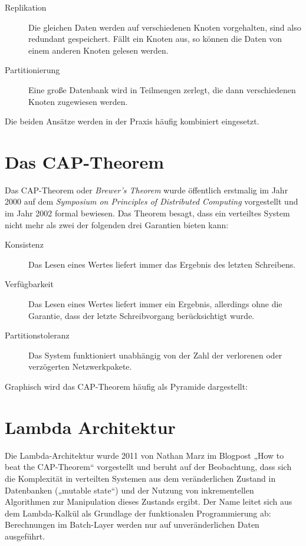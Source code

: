 \documentclass[a4paper,11pt]{scrartcl}
\begin{document}
  \begin{description}
    \item[Replikation] Die gleichen Daten werden auf verschiedenen Knoten
      vorgehalten, sind also redundant gespeichert. Fällt ein Knoten aus, so
      können die Daten von einem anderen Knoten gelesen werden.
    \item[Partitionierung] Eine große Datenbank wird in Teilmengen zerlegt, die
      dann verschiedenen Knoten zugewiesen werden.
  \end{description}

  Die beiden Ansätze werden in der Praxis häufig kombiniert eingesetzt.

  \section{Das CAP-Theorem}
  Das CAP-Theorem oder \textit{Brewer's Theorem} wurde öffentlich erstmalig im
  Jahr 2000 auf dem \textit{Symposium on Principles of Distributed Computing}
  vorgestellt und im Jahr 2002 formal bewiesen. Das Theorem besagt, dass ein
  verteiltes System nicht mehr als zwei der folgenden drei Garantien bieten
  kann:\cite[S.~51-59]{brewer02}

  \begin{description}
    \item[Konsistenz] Das Lesen eines Wertes liefert immer das Ergebnis des
      letzten Schreibens.
    \item[Verfügbarkeit] Das Lesen eines Wertes liefert immer ein Ergebnis,
      allerdings ohne die Garantie, dass der letzte Schreibvorgang berücksichtigt
      wurde.
    \item[Partitionstoleranz] Das System funktioniert unabhängig von der Zahl der
      verlorenen oder verzögerten Netzwerkpakete.
  \end{description}

  Graphisch wird das CAP-Theorem häufig als Pyramide dargestellt:


  \section{Lambda Architektur}
  Die Lambda-Architektur wurde 2011 von Nathan Marz im Blogpost „How to beat
  the CAP-Theorem“\cite{marz2011} vorgestellt und beruht auf der Beobachtung,
  dass sich die Komplexität in verteilten Systemen aus dem veränderlichen
  Zustand in Datenbanken („mutable state“) und der Nutzung von inkrementellen
  Algorithmen zur Manipulation dieses Zustands ergibt.  Der Name leitet sich
  aus dem Lambda-Kalkül als Grundlage der funktionalen Programmierung ab:
  Berechnungen im Batch-Layer werden nur auf unveränderlichen Daten ausgeführt.
\end{document}
